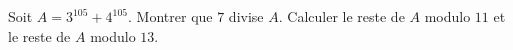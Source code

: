 Soit $A = 3^{105} + 4^{105}$. Montrer que $7$ divise $A$. Calculer le reste de $A$ modulo $11$ et le reste de $A$ modulo $13$.
